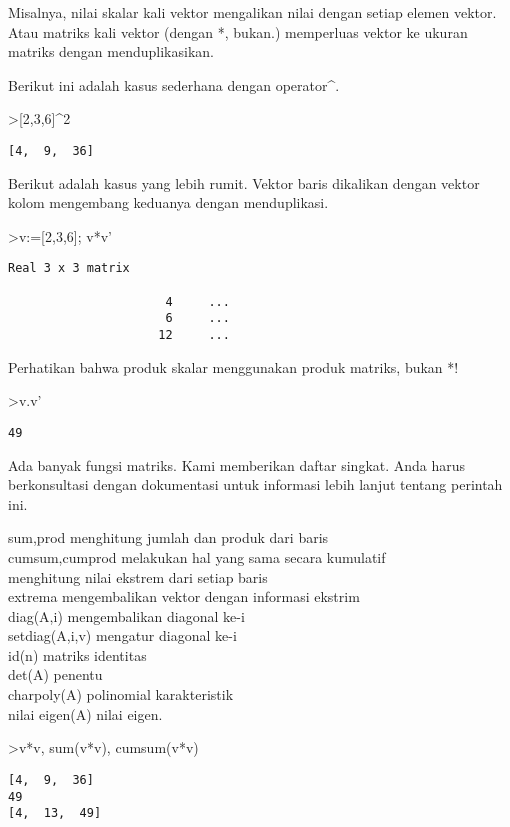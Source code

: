 \documentclass[
]{book}
\begin{document}
Misalnya, nilai skalar kali vektor mengalikan nilai dengan setiap elemen vektor. Atau matriks kali vektor (dengan *, bukan.) memperluas vektor ke ukuran matriks dengan menduplikasikan.

Berikut ini adalah kasus sederhana dengan operator\^{}.

\textgreater{[}2,3,6{]}\^{}2

\begin{verbatim}
[4,  9,  36]
\end{verbatim}

Berikut adalah kasus yang lebih rumit. Vektor baris dikalikan dengan vektor kolom mengembang keduanya dengan menduplikasi.

\textgreater v:={[}2,3,6{]}; v*v'

\begin{verbatim}
Real 3 x 3 matrix

                      4     ...
                      6     ...
                     12     ...
\end{verbatim}

Perhatikan bahwa produk skalar menggunakan produk matriks, bukan *!

\textgreater v.v'

\begin{verbatim}
49
\end{verbatim}

Ada banyak fungsi matriks. Kami memberikan daftar singkat. Anda harus berkonsultasi dengan dokumentasi untuk informasi lebih lanjut tentang perintah ini.

sum,prod menghitung jumlah dan produk dari baris\\
cumsum,cumprod melakukan hal yang sama secara kumulatif\\
menghitung nilai ekstrem dari setiap baris\\
extrema mengembalikan vektor dengan informasi ekstrim\\
diag(A,i) mengembalikan diagonal ke-i\\
setdiag(A,i,v) mengatur diagonal ke-i\\
id(n) matriks identitas\\
det(A) penentu\\
charpoly(A) polinomial karakteristik\\
nilai eigen(A) nilai eigen.

\textgreater v*v, sum(v*v), cumsum(v*v)

\begin{verbatim}
[4,  9,  36]
49
[4,  13,  49]
\end{verbatim}
\end{document}
